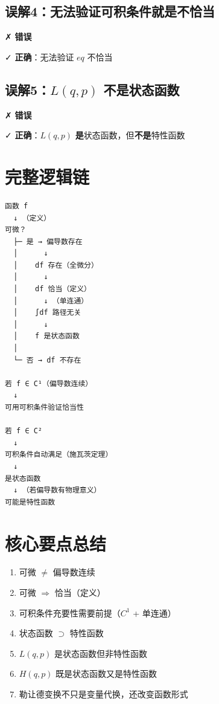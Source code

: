 \documentclass[12pt,a4paper]{article}
\begin{document}
\subsection{误解4：无法验证可积条件就是不恰当}

✗ \textbf{错误}

✓ \textbf{正确}：无法验证 $
eq$ 不恰当

\subsection{误解5：$L(q,p)$ 不是状态函数}

✗ \textbf{错误}

✓ \textbf{正确}：$L(q,p)$ \textbf{是}状态函数，但\textbf{不是}特性函数

\section{完整逻辑链}

\begin{verbatim}
函数 f
  ↓ （定义）
可微？
  ├─ 是 → 偏导数存在
  │      ↓
  │    df 存在（全微分）
  │      ↓
  │    df 恰当（定义）
  │      ↓ （单连通）
  │    ∫df 路径无关
  │      ↓
  │    f 是状态函数
  │
  └─ 否 → df 不存在

若 f ∈ C¹（偏导数连续）
  ↓
可用可积条件验证恰当性

若 f ∈ C²
  ↓
可积条件自动满足（施瓦茨定理）
  ↓
是状态函数
  ↓ （若偏导数有物理意义）
可能是特性函数
\end{verbatim}

\section{核心要点总结}

\begin{keypoint}
\begin{enumerate}
\item 可微 $\neq$ 偏导数连续
\item 可微 $\Rightarrow$ 恰当（定义）
\item 可积条件充要性需要前提（$C^1$ + 单连通）
\item 状态函数 $\supset$ 特性函数
\item $L(q,p)$ 是状态函数但非特性函数
\item $H(q,p)$ 既是状态函数又是特性函数
\item 勒让德变换不只是变量代换，还改变函数形式
\end{enumerate}
\end{keypoint}
\end{document}
